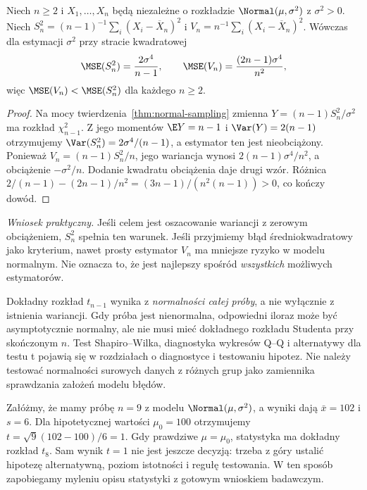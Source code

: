 \begin{stwierdzenie}
\label{prop:mse-samplevariance}
Niech $n\ge2$ i $X_1,\ldots,X_n$ będą niezależne o rozkładzie
$\Normal(\mu,\sigma^2)$ z $\sigma^2>0$. Niech
$S_n^2=(n-1)^{-1}\sum_i(X_i-\overline X_n)^2$ i
$V_n=n^{-1}\sum_i(X_i-\overline X_n)^2$.
Wówczas dla estymacji $\sigma^2$ przy stracie kwadratowej
\[
\MSE(S_n^2)=\frac{2\sigma^4}{n-1},\qquad
\MSE(V_n)=\frac{(2n-1)\sigma^4}{n^2},
\]
więc $\MSE(V_n)<\MSE(S_n^2)$ dla każdego $n\ge2$.
\end{stwierdzenie}
\begin{proof}
Na mocy twierdzenia~\ref{thm:normal-sampling} zmienna
$Y=(n-1)S_n^2/\sigma^2$ ma rozkład $\chi^2_{n-1}$.
Z jego momentów $\E Y=n-1$ i $\Var(Y)=2(n-1)$ otrzymujemy
$\Var(S_n^2)=2\sigma^4/(n-1)$, a estymator ten jest nieobciążony.
Ponieważ $V_n=(n-1)S_n^2/n$, jego wariancja wynosi
$2(n-1)\sigma^4/n^2$, a obciążenie $-\sigma^2/n$.
Dodanie kwadratu obciążenia daje drugi wzór.
Różnica \mbox{$2/(n-1)-(2n-1)/n^2=(3n-1)/(n^2(n-1))>0$},
co kończy dowód.
\end{proof}
\emph{Wniosek praktyczny.} Jeśli celem jest oszacowanie wariancji z
zerowym obciążeniem, $S_n^2$ spełnia ten warunek. Jeśli przyjmiemy
błąd średniokwadratowy jako kryterium, nawet prosty estymator
$V_n$ ma mniejsze ryzyko w modelu normalnym. Nie oznacza to, że
jest najlepszy spośród \emph{wszystkich} możliwych estymatorów.

\begin{uwaga}
Dokładny rozkład $t_{n-1}$ wynika z \emph{normalności całej próby}, a nie wyłącznie z istnienia wariancji. Gdy próba jest nienormalna, odpowiedni iloraz może być asymptotycznie normalny, ale nie musi mieć dokładnego rozkładu Studenta przy skończonym $n$. Test Shapiro--Wilka, diagnostyka wykresów Q--Q i alternatywy dla testu t pojawią się w rozdziałach o diagnostyce i testowaniu hipotez. Nie należy testować normalności surowych danych z różnych grup jako zamiennika sprawdzania założeń modelu błędów.
\end{uwaga}

\begin{przyklad}\label{ex:t-demo}
Załóżmy, że mamy próbę $n=9$ z modelu $\Normal(\mu,\sigma^2)$, a wyniki dają $\bar x=102$ i $s=6$. Dla hipotetycznej wartości $\mu_0=100$ otrzymujemy $t=\sqrt9(102-100)/6=1$. Gdy prawdziwe $\mu=\mu_0$, statystyka ma dokładny rozkład $t_8$. Sam wynik $t=1$ nie jest jeszcze decyzją: trzeba z góry ustalić hipotezę alternatywną, poziom istotności i regułę testowania. W ten sposób zapobiegamy myleniu opisu statystyki z gotowym wnioskiem badawczym.
\end{przyklad}

